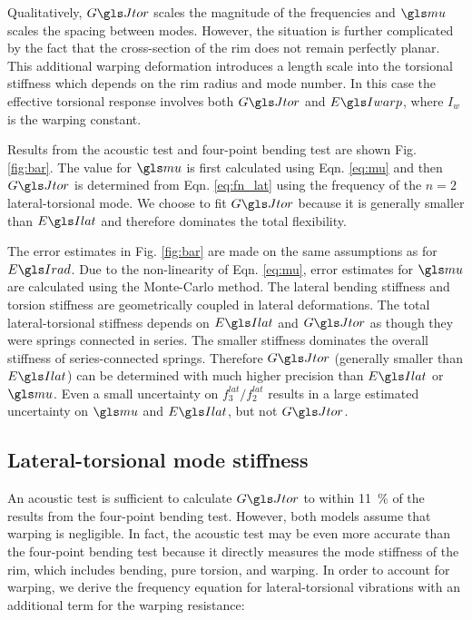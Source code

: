 \documentclass[../thesis.tex]{subfiles}
\begin{document}
Qualitatively, $\GJ$ scales the magnitude of the frequencies and $\m$ scales the spacing between modes. However, the situation is further complicated by the fact that the cross-section of the rim does not remain perfectly planar. This additional warping deformation introduces a length scale into the torsional stiffness which depends on the rim radius and mode number. In this case the effective torsional response involves both $\GJ$ and $\EIw$, where $I_w$ is the warping constant.

Results from the acoustic test and four-point bending test are shown Fig. \ref{fig:bar}. The value for $\m$ is first calculated using Eqn. \eqref{eq:mu} and then $\GJ$ is determined from Eqn. \eqref{eq:fn_lat} using the frequency of the $n=2$ lateral-torsional mode. We choose to fit $\GJ$ because it is generally smaller than $\EIl$ and therefore dominates the total flexibility.

The error estimates in Fig. \ref{fig:bar} are made on the same assumptions as for $\EIr$. Due to the non-linearity of Eqn. \eqref{eq:mu}, error estimates for $\m$ are calculated using the Monte-Carlo method. The lateral bending stiffness and torsion stiffness are geometrically coupled in lateral deformations. The total lateral-torsional stiffness depends on $\EIl$ and $\GJ$ as though they were springs connected in series. The smaller stiffness dominates the overall stiffness of series-connected springs. Therefore $\GJ$ (generally smaller than $\EIl$) can be determined with much higher precision than $\EIl$ or $\m$. Even a small uncertainty on $f_3^{lat}/f_2^{lat}$ results in a large estimated uncertainty on $\m$ and $\EIl$, but not $\GJ$.

\subsection{Lateral-torsional mode stiffness}
An acoustic test is sufficient to calculate $\GJ$ to within \SI{11}{\percent} of the results from the four-point bending test. However, both models assume that warping is negligible. In fact, the acoustic test may be even more accurate than the four-point bending test because it directly measures the mode stiffness of the rim, which includes bending, pure torsion, and warping. In order to account for warping, we derive the frequency equation for lateral-torsional vibrations with an additional term for the warping resistance:
\end{document}
